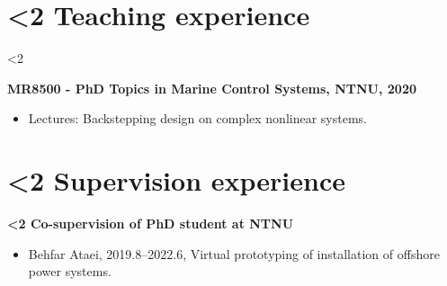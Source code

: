 \documentclass[10pt]{ctexart}
\begin{document}
\section*{\textbf{\ifnum\value{num}<2 {Teaching experience}  \fi}}
\ifnum\value{num}<2 {
    \begin{minipage}{\textwidth}
    \textbf{MR8500 - PhD Topics in Marine Control Systems, NTNU, 2020}
    \begin{itemize}[label={}] \setlength\itemsep{0.5em}
    \item Lectures: Backstepping design on complex nonlinear systems.
    \end{itemize}
    \end{minipage}
}\fi
\vspace*{0.5em}

\section*{\textbf{\ifnum\value{num}<2 {Supervision experience}  \fi}}
\begin{minipage}{\textwidth}
\textbf{\ifnum\value{num}<2 {Co-supervision of PhD student at NTNU}  \fi}
\begin{itemize}[label={}] \setlength\itemsep{0.5em}
    \item Behfar Ataei, 2019.8--2022.6, Virtual prototyping of installation of offshore power systems.
\end{itemize}
\end{minipage}
\vspace*{0.5em}
\end{document}
